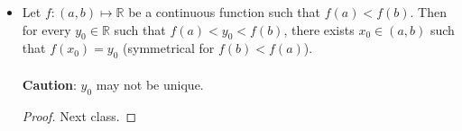 \documentclass{article}
\newcommand{\R}{\mathbb{R}}
\newcommand{\?}{\stackrel{?}{=}}
\theoremstyle{definition} %
\newtheorem{definition}[subsection]{Definition} %
\begin{document}
\begin{itemize}
    \begin{definition}[Continuity on a closed interval]
        We say $f: [a, b] \mapsto \R$ is \textbf{continuous on a closed interval} if it is continuous on $(a, b)$ and $\lim_{x \to x_0^+} f(x) = f(a), \lim_{x \to x_0^-} f(x) = f(b)$. \\\\
        We write $f \in C^0\big([a, b]\big)$.
    \end{definition}
    \item[]
    \begin{theorem}
        Let $f: (a, b) \mapsto \R$ be a continuous function such that $f(a) < f(b)$. Then for every $y_0 \in \R$ such that $f(a) < y_0 < f(b)$, there exists $x_0 \in (a, b)$ such that $f(x_0) = y_0$ (symmetrical for $f(b) < f(a)$). \\\\
        \danger \textbf{Caution}: $y_0$ may not be unique.
    \end{theorem}
    \begin{proof}
        Next class.
    \end{proof}
\end{itemize}

\newpage

\listoftheorems[]
 
\end{document}
